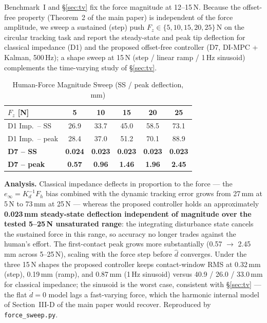 \documentclass[journal]{IEEEtran}
\newcommand{\dhat}{\hat{d}}
\begin{document}
Benchmark~I and \S\ref{sec:tv} fix the force magnitude at 12--15\,N.
Because the offset-free property (Theorem~2 of the main paper) is
independent of the force amplitude, we sweep a sustained (step) push
$F_z\in\{5,10,15,20,25\}$\,N on the circular tracking task and report the
steady-state and peak tip deflection for classical impedance (D1) and
the proposed offset-free controller (D7, DI-MPC + Kalman, 500\,Hz); a
shape sweep at 15\,N (step / linear ramp / 1\,Hz sinusoid) complements
the time-varying study of \S\ref{sec:tv}.

\begin{table}[!t]
\caption{Human-Force Magnitude Sweep (SS / peak deflection, mm)}
\label{tab:fsweep}
\renewcommand{\arraystretch}{1.0}
\footnotesize
\setlength{\tabcolsep}{3pt}
\begin{tabular}{lccccc}
\toprule
$F_z$ [N] & 5 & 10 & 15 & 20 & 25\\
\midrule
D1 Imp.\ -- SS   & 26.9 & 33.7 & 45.0 & 58.5 & 73.1\\
D1 Imp.\ -- peak & 28.4 & 37.0 & 51.2 & 70.1 & 88.9\\
\textbf{D7 -- SS}   & \textbf{0.024} & \textbf{0.023} & \textbf{0.023} & \textbf{0.023} & \textbf{0.023}\\
\textbf{D7 -- peak} & \textbf{0.57} & \textbf{0.96} & \textbf{1.46} & \textbf{1.96} & \textbf{2.45}\\
\bottomrule
\end{tabular}
\end{table}

\textbf{Analysis.} Classical impedance deflects in proportion to the
force --- the $e_\infty=K_d^{-1}F_h$ bias combined with the dynamic
tracking error grows from 27\,mm at 5\,N to 73\,mm at 25\,N --- whereas
the proposed controller holds an approximately \textbf{0.023\,mm
steady-state deflection independent of magnitude over the tested
5--25\,N unsaturated range}: the integrating disturbance state cancels
the sustained force in this range, so accuracy no longer trades against
the human's effort. The first-contact peak grows
more substantially (0.57 $\to$ 2.45\,mm across 5--25\,N), scaling with the
force step before $\dhat$ converges. Under the three 15\,N shapes the
proposed controller keeps contact-window RMS at 0.32\,mm (step), 0.19\,mm
(ramp), and 0.87\,mm (1\,Hz sinusoid) versus 40.9 / 26.0 / 33.0\,mm for
classical impedance; the sinusoid is the worst case, consistent with
\S\ref{sec:tv} --- the flat $\dot d=0$ model lags a fast-varying force,
which the harmonic internal model of Section~III-D of the main paper
would recover. Reproduced by \texttt{force\_sweep.py}.
\end{document}

